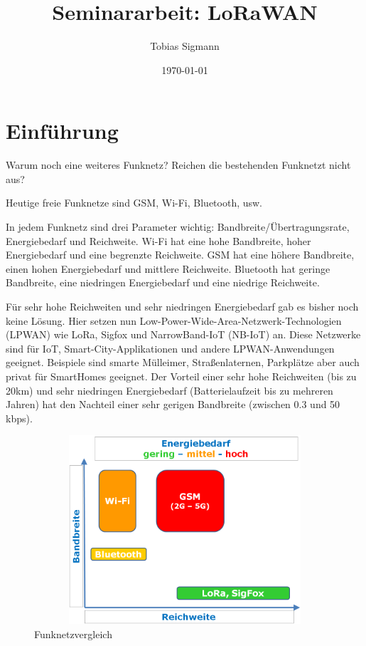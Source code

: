 \documentclass[a4paper, 12pt]{article}
\author{Tobias Sigmann}
\title{Seminararbeit: LoRaWAN}
\date{\today}
\begin{document}
    \maketitle
    \newpage
    \tableofcontents
    \newpage

    \section{Einführung}
        Warum noch eine weiteres Funknetz? 
        Reichen die bestehenden Funknetzt nicht aus?

        Heutige freie Funknetze sind GSM, Wi-Fi, Bluetooth, usw.
        
        In jedem Funknetz sind drei Parameter wichtig: Bandbreite/Übertragungsrate, Energiebedarf und Reichweite.
        Wi-Fi hat eine hohe Bandbreite, hoher Energiebedarf und eine begrenzte Reichweite. 
        GSM hat eine höhere Bandbreite, einen hohen Energiebedarf und mittlere Reichweite.
        Bluetooth hat geringe Bandbreite, eine niedringen Energiebedarf und eine niedrige Reichweite.
        
        Für sehr hohe Reichweiten und sehr niedringen Energiebedarf gab es bisher noch keine Lösung.
        Hier setzen nun Low-­Power-Wide-Area-Netzwerk-Technologien
        (LPWAN) wie LoRa, Sigfox und NarrowBand-IoT (NB-IoT) an. Diese Netzwerke sind für IoT,
        Smart-City-Applikationen und andere LPWAN-Anwendungen geeignet.
        Beispiele sind smarte Mülleimer, Straßenlaternen, Parkplätze aber auch privat für SmartHomes geeignet.
        Der Vorteil einer sehr hohe Reichweiten (bis zu 20km) und sehr niedringen Energiebedarf (Batterielaufzeit
        bis zu mehreren Jahren) hat den Nachteil einer sehr gerigen Bandbreite (zwischen 0.3 und 50 kbps). 


        \begin{figure}[ht]
            \centering
            \includegraphics[width=13cm, height=7cm]{Einfuehrung}
            \caption{Funknetzvergleich}
        \end{figure}
\end{document}

